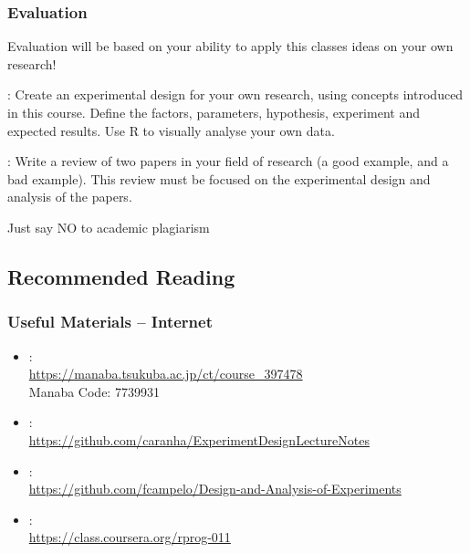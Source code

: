 \documentclass{beamer}
\begin{document}
\begin{frame}
  \frametitle{Evaluation}

  Evaluation will be based on your ability to apply this classes ideas
  on your own research!

  \begin{description}
    {\small
  \item[Main Report]: Create an experimental design for your own
    research, using concepts introduced in this course. Define the
    factors, parameters, hypothesis, experiment and expected
    results. Use R to visually analyse your own data.

    \bigskip

  \item[Report on Good/Bad Science]: Write a review of two papers in
    your field of research (a good example, and a bad example). This
    review must be focused on the experimental design and analysis of
    the papers.  }
  \end{description}
  \vfill
  \begin{block}{}
    \begin{center}
      \alert{Just say NO to academic plagiarism}
    \end{center}
  \end{block}
\end{frame}


\subsection{Recommended Reading}
\begin{frame}
  \frametitle{Useful Materials -- Internet}

  \begin{itemize}
  \item {}:\\\url{https://manaba.tsukuba.ac.jp/ct/course_397478}\\ Manaba
    Code: 7739931
  \item {}:\\\url{https://github.com/caranha/ExperimentDesignLectureNotes}
  \item {}:\\\url{https://github.com/fcampelo/Design-and-Analysis-of-Experiments}
  \item {}:\\\url{https://class.coursera.org/rprog-011}
  \end{itemize}
\end{frame}
\end{document}
